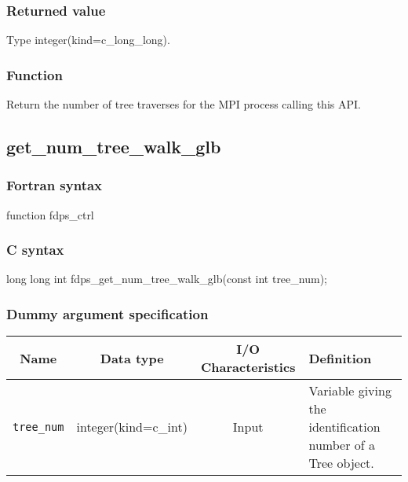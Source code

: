 \subsubsection*{Returned value}
Type integer(kind=c\_long\_long).

\subsubsection*{Function}
Return the number of tree traverses for the MPI process calling this API.

\clearpage

\subsection{get\_num\_tree\_walk\_glb}
\subsubsection*{Fortran syntax}
\begin{screen}
\begin{spverbatim}
function fdps_ctrl%
\end{spverbatim}
\end{screen}

\subsubsection*{C syntax}
\begin{screen}
\begin{spverbatim}
long long int fdps_get_num_tree_walk_glb(const int tree_num);
\end{spverbatim}
\end{screen}

\subsubsection*{Dummy argument specification}
\begin{table}[h]
\begin{tabularx}{\linewidth}{cccX}
\toprule
\rowcolor{Snow2}
Name & Data type & I/O Characteristics & Definition \\
\midrule
\verb|tree_num| & integer(kind=c\_int) & Input & Variable giving the identification number of a Tree object. \\
\bottomrule
\end{tabularx}
\end{table}

